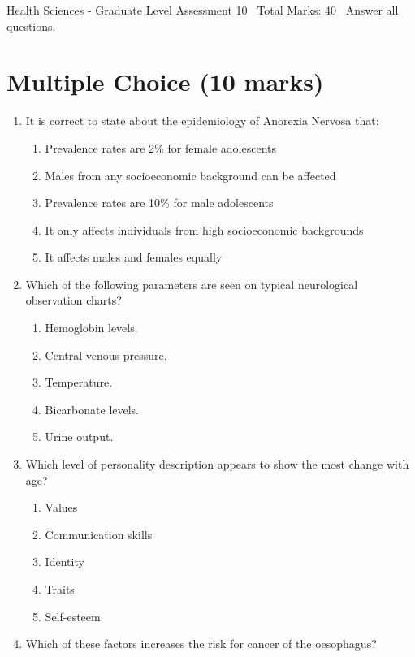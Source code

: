 \documentclass[12pt]{article}
\begin{document}
\begin{center}
Health Sciences - Graduate Level Assessment 10 \
Total Marks: 40 \
Answer all questions.
\end{center}

\section*{Multiple Choice (10 marks)}
\begin{enumerate}[label=\arabic*.]
\item It is correct to state about the epidemiology of Anorexia Nervosa that:
\begin{enumerate}[label=(\alph*)]
    \item Prevalence rates are 2\% for female adolescents
    \item Males from any socioeconomic background can be affected
    \item Prevalence rates are 10\% for male adolescents
    \item It only affects individuals from high socioeconomic backgrounds
    \item It affects males and females equally
\end{enumerate}
\item Which of the following parameters are seen on typical neurological observation charts?
\begin{enumerate}[label=(\alph*)]
    \item Hemoglobin levels.
    \item Central venous pressure.
    \item Temperature.
    \item Bicarbonate levels.
    \item Urine output.
\end{enumerate}
\item Which level of personality description appears to show the most change with age?
\begin{enumerate}[label=(\alph*)]
    \item Values
    \item Communication skills
    \item Identity
    \item Traits
    \item Self-esteem
\end{enumerate}
\item Which of these factors increases the risk for cancer of the oesophagus?
\begin{enumerate}[label=(\alph*)]

\end{enumerate}
\end{enumerate}
\end{document}
